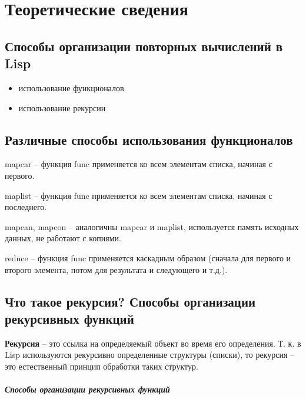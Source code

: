\chapter{Теоретические сведения}

\section{Способы организации повторных вычислений в Lisp}

\begin{itemize}
    \item использование функционалов
    \item использование рекурсии
\end{itemize}

\section{Различные способы использования функционалов}

{\ttfamily mapcar} -- функция func применяется ко всем элементам списка, начиная
с первого.

{\ttfamily maplist} -- функция func применяется ко всем элементам списка, начиная
с последнего.

{\ttfamily mapcan, mapcon} -- аналогичны mapcar и maplist, используется память
исходных данных, не работают с копиями.

{\ttfamily reduce} -- функция func применяется каскадным образом
(сначала для первого и второго элемента, потом для результата и следующего и т.д.).

\section{Что такое рекурсия?
Способы организации рекурсивных функций}

\textbf{Рекурсия} -- это ссылка на определяемый объект во
время его определения.
Т. к. в Lisp используются рекурсивно определенные структуры (списки),
то рекурсия -- это естественный принцип обработки таких структур.

\paragraph{Способы организации рекурсивных функций}

